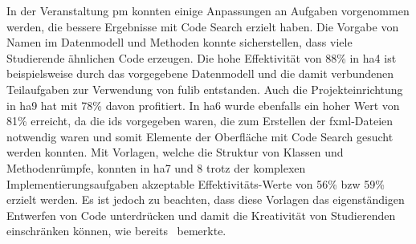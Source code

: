 In der Veranstaltung \ac{pm} konnten einige Anpassungen an Aufgaben vorgenommen werden, die bessere Ergebnisse mit Code Search erzielt haben.
Die Vorgabe von Namen im Datenmodell und Methoden konnte sicherstellen, dass viele Studierende ähnlichen Code erzeugen.
Die hohe Effektivität von 88\% in \ac{ha}4 ist beispielsweise durch das vorgegebene Datenmodell und die damit verbundenen Teilaufgaben zur Verwendung von fulib entstanden.
Auch die Projekteinrichtung in \ac{ha}9 hat mit 78\% davon profitiert.
In \ac{ha}6 wurde ebenfalls ein hoher Wert von 81\% erreicht, da die \acp{id} vorgegeben waren, die zum Erstellen der \ac{fxml}-Dateien notwendig waren und somit Elemente der Oberfläche mit Code Search gesucht werden konnten.
Mit Vorlagen, welche die Struktur von Klassen und Methodenrümpfe, konnten in \ac{ha}7 und 8 trotz der komplexen Implementierungsaufgaben akzeptable Effektivitäts-Werte von 56\% \ac{bzw} 59\% erzielt werden.
Es ist jedoch zu beachten, dass diese Vorlagen das eigenständigen Entwerfen von Code unterdrücken und damit die Kreativität von Studierenden einschränken können, wie bereits~\todo{} bemerkte.
